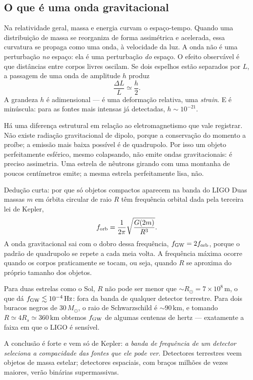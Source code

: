 \documentclass[11pt,a4paper]{article}
\begin{document}
\subsection*{O que é uma onda gravitacional}

Na relatividade geral, massa e energia curvam o espaço-tempo. Quando uma distribuição de massa se reorganiza de forma assimétrica e acelerada, essa curvatura se propaga como uma onda, à velocidade da luz. A onda não é uma perturbação \emph{no} espaço: ela é uma perturbação \emph{do} espaço. O efeito observável é que distâncias entre corpos livres oscilam. Se dois espelhos estão separados por $L$, a passagem de uma onda de amplitude $h$ produz
\[
\frac{\Delta L}{L}\simeq\frac{h}{2}.
\]
A grandeza $h$ é adimensional --- é uma deformação relativa, uma \textit{strain}. E é minúscula: para as fontes mais intensas já detectadas, $h\sim10^{-21}$.

Há uma diferença estrutural em relação ao eletromagnetismo que vale registrar. Não existe radiação gravitacional de dipolo, porque a conservação do momento a proíbe; a emissão mais baixa possível é de quadrupolo. Por isso um objeto perfeitamente esférico, mesmo colapsando, não emite ondas gravitacionais: é preciso assimetria. Uma estrela de nêutrons girando com uma montanha de poucos centímetros emite; a mesma estrela perfeitamente lisa, não.

\begin{lessonblock}[borderline west={2pt}{0pt}{astroGold}]{Dedução curta: por que só objetos compactos aparecem na banda do LIGO}
Duas massas $m$ em órbita circular de raio $R$ têm frequência orbital dada pela terceira lei de Kepler,
\[
f_{\rm orb}=\frac{1}{2\pi}\sqrt{\frac{G(2m)}{R^{3}}}.
\]
A onda gravitacional sai com o dobro dessa frequência, $f_{\rm GW}=2f_{\rm orb}$, porque o padrão de quadrupolo se repete a cada meia volta. A frequência máxima ocorre quando os corpos praticamente se tocam, ou seja, quando $R$ se aproxima do próprio tamanho dos objetos.

Para duas estrelas como o Sol, $R$ não pode ser menor que $\sim R_\odot=7\times10^{8}\,\mathrm{m}$, o que dá $f_{\rm GW}\lesssim10^{-4}\,\mathrm{Hz}$: fora da banda de qualquer detector terrestre. Para dois buracos negros de $30\,M_\odot$, o raio de Schwarzschild é $\sim90\,\mathrm{km}$, e tomando $R\simeq4R_s\simeq360\,\mathrm{km}$ obtemos $f_{\rm GW}$ de algumas centenas de hertz --- exatamente a faixa em que o LIGO é sensível.

A conclusão é forte e vem só de Kepler: \emph{a banda de frequência de um detector seleciona a compacidade das fontes que ele pode ver}. Detectores terrestres veem objetos de massa estelar; detectores espaciais, com braços milhões de vezes maiores, verão binárias supermassivas.
\end{lessonblock}
\end{document}

